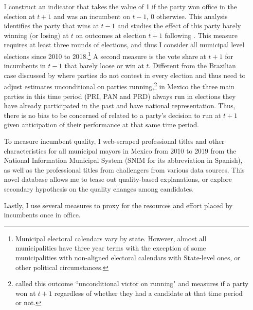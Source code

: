 \documentclass[12pt]{amsart}
\makeatletter
\def\section{\@startsection{section}{1}
	\z@{1.0\linespacing\@plus\linespacing}{.5\linespacing}{\Large}}
\def\subsection{\@startsection{subsection}{2}
	\z@{.8\linespacing\@plus.7\linespacing}{.7\linespacing}{\large}}
\numberwithin{equation}{section}
\theoremstyle{definition}
\theoremstyle{definition}
\theoremstyle{definition}
\makeatother
\begin{document}
\subsection{Data}

I construct an indicator that takes the value of 1 if the party won office in the election at $t+1$ and was an incumbent on $t-1$, 0 otherwise. This analysis identifies the party that wins at $t-1$ and studies the effect of this party barely winning (or losing) at $t$ on outcomes at election $t+1$ following \citet{klasnja_titiunik_2017}. This measure requires at least three rounds of elections, and thus I consider all municipal level elections since 2010 to 2018.\footnote{Municipal electoral calendars vary by state. However, almost all municipalities have three year terms with the exception of some municipalities with non-aligned electoral calendars with State-level ones, or other political circumstances.} A second measure is the vote share at $t+1$ for incumbents in $t-1$ that barely loose or win at $t$. Different from the Brazilian case discussed by \citet{klasnja_titiunik_2017} where parties do not contest in every election and thus need to adjust estimates unconditional on parties running,\footnote{\citet{klasnja_titiunik_2017} called this outcome ``unconditional victor on running" and measures if a party won at $t+1$ regardless of whether they had a candidate at that time period or not.} in Mexico the three main parties in this time period (PRI, PAN and PRD) always run in elections they have already participated in the past and have national representation. Thus, there is no bias to be concerned of related to a party's decision to run at $t+1$ given anticipation of their performance at that same time period.  

To measure incumbent quality, I web-scraped professional titles and other characteristics for all municipal mayors in Mexico from 2010 to 2019 from the National Information Municipal System (SNIM for its abbreviation in Spanish), as well as the professional titles from challengers from various data sources. This novel database allows me to tease out quality-based explanations, or explore secondary hypothesis on the quality changes among candidates.

Lastly, I use several measures to proxy for the resources and effort placed by incumbents once in office. %

\section{Main Results}
   
\end{document}
